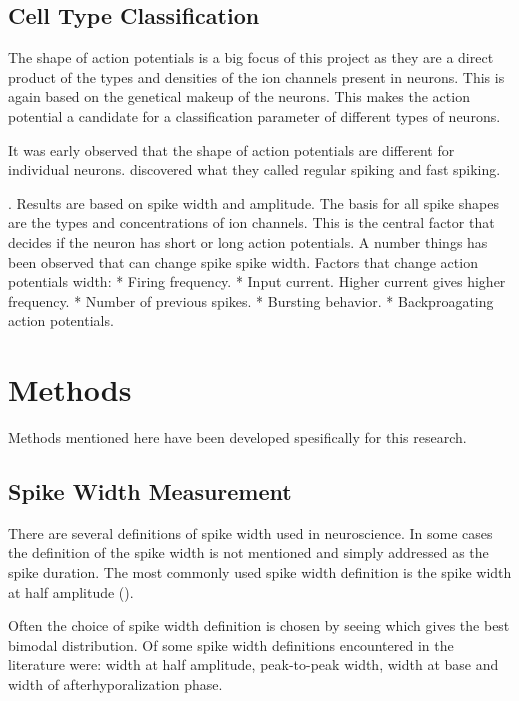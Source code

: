 \documentclass[altfont, fleqn]{uiophd}
\begin{document}

\section{Cell Type Classification}

The shape of action potentials is a big focus of this project
as they are a direct product of the types and densities of the ion channels
present in neurons. 
This is again based on the genetical makeup of the neurons. 
This makes the action potential a candidate for a classification parameter
of different types of neurons. 

It was early observed that the shape of action potentials are different for 
individual neurons. \textcite{mountcastle_cortical_1969} discovered what
they called regular spiking and fast spiking.

\cite{mountcastle_cortical_1969}.
Results are based on spike width and amplitude.
The basis for all spike shapes are the types and concentrations of
ion channels.
This is the central factor that decides if the neuron has short or long action potentials.
A number things has been observed that can change spike spike width.
Factors that change action potentials width:
* Firing frequency.
* Input current. Higher current gives higher frequency.
* Number of previous spikes.
* Bursting behavior.
* Backproagating action potentials.

\chapter{Methods}
Methods mentioned here have been developed spesifically for this research. 
\vspace{1em} 
\startcontents
{}
\section{Spike Width Measurement}
There
are several definitions of spike width used in neuroscience. 
In some cases the definition of the spike width is not mentioned
and simply addressed as the spike duration. 
The most commonly used spike width definition is the spike width at half 
amplitude
(\textcite{bean_action_2007}).

Often the choice of spike width definition is chosen by
seeing which gives the best bimodal distribution. 
Of some spike width definitions encountered in the literature 
were:
width at half amplitude, 
peak-to-peak width, 
width at base
and 
width of afterhyporalization phase. 
\end{document}

